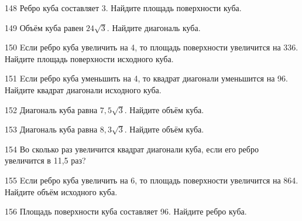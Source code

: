 \begin{taskBN}{148}
Ребро куба составляет 3. Найдите площадь поверхности куба.
\end{taskBN}

\begin{taskBN}{149}
Объём куба равен $24\sqrt{3}$. Найдите диагональ куба.
\end{taskBN}

\begin{taskBN}{150}
Eсли ребро куба увеличить на 4, то площадь поверхности увеличится на 336. Найдите площадь поверхности исходного куба.
\end{taskBN}

\begin{taskBN}{151}
Eсли ребро куба уменьшить на 4, то квадрат диагонали уменьшится на 96. Найдите квадрат диагонали исходного куба.
\end{taskBN}

\begin{taskBN}{152}
Диагональ куба равна $7,5\sqrt{3}$. Найдите объём куба.
\end{taskBN}

\begin{taskBN}{153}
Диагональ куба равна $8,3\sqrt{3}$. Найдите объём куба.
\end{taskBN}

\begin{taskBN}{154}
Во сколько раз увеличится квадрат диагонали куба, если его ребро увеличится в 11,5 раз?
\end{taskBN}

\begin{taskBN}{155}
Eсли ребро куба увеличить на 6, то площадь поверхности увеличится на 864. Найдите объём исходного куба.
\end{taskBN}

\begin{taskBN}{156}
Площадь поверхности куба составляет 96. Найдите ребро куба.
\end{taskBN}

